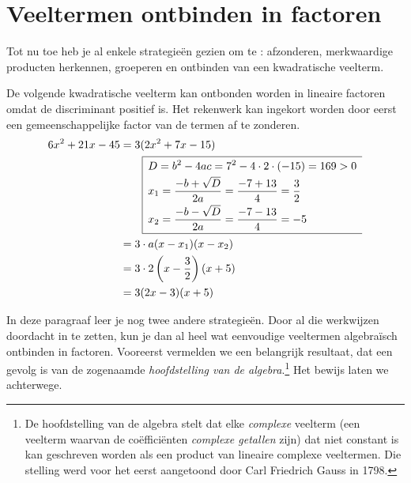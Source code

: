 \documentclass{ximera}
\begin{document}
	\author{Koen De Naeghel}
	\label{xim:veeltermen_ontbinden_in_factoren}
\section{Veeltermen ontbinden in factoren}

Tot nu toe heb je al enkele strategie\"en gezien om te : afzonderen, merkwaardige producten herkennen, groeperen en ontbinden van een kwadratische veelterm.

\begin{example}
De volgende kwadratische veelterm kan ontbonden worden in lineaire factoren omdat de discriminant positief is. Het rekenwerk kan ingekort worden door eerst een gemeenschappelijke factor van de termen af te zonderen. 
\begin{align*}
6x^2+21x-45 & = 3(2x^2 + 7x - 15) \\
& \qquad 
\begin{array}{|l}
\hline
\begin{aligned}
\vrule height 0.4cm width 0cm
& D = b^2 - 4ac = 7^2-4\cdot 2 \cdot (-15) = 169 > 0 \\[0.1cm] 
& x_{1} = \frac{-b + \sqrt{D}}{2a} = \frac{-7 + 13}{4} = \frac{3}{2} \\[0.1cm] 
& x_{2} = \frac{-b - \sqrt{D}}{2a} = \frac{-7 - 13}{4} = -5 \\[0.1cm]
\end{aligned} \\
\hline
\end{array} \\
& = 3 \cdot a(x-x_1)(x-x_2) \\
& = 3 \cdot 2\left(x- \frac{3}{2}\right)(x+5) \\
& = 3(2x-3)(x+5)
\end{align*}
\end{example}

In deze paragraaf leer je nog twee andere strategie\"en. Door al die werkwijzen doordacht in te zetten, kun je dan al heel wat eenvoudige veeltermen algebra\"isch ontbinden in factoren. Vooreerst vermelden we een belangrijk resultaat, dat een gevolg is van de zogenaamde {\em hoofdstelling van de algebra}.\footnote{De hoofdstelling van de algebra stelt dat elke {\em complexe} veelterm (een veelterm waarvan de co\"effici\"enten {\em complexe getallen} zijn) dat niet constant is kan geschreven worden als een product van lineaire complexe veeltermen. Die stelling werd voor het eerst aangetoond door Carl Friedrich Gauss in 1798.} Het bewijs laten we achterwege.
\end{document}
